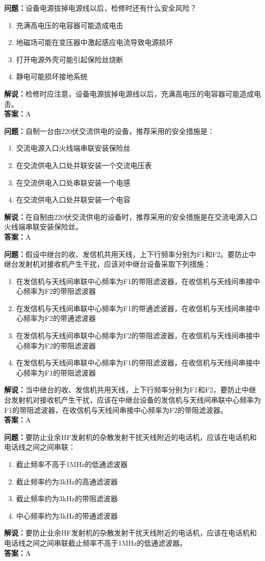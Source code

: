 \documentclass{ctexbook}%
\begin{document}
\textbf{问题：}设备电源拔掉电源线以后，检修时还有什么安全风险？
\begin{enumerate}[label=\Alph*), leftmargin=3em]
\item 充满高电压的电容器可能造成电击
\item 地磁场可能在变压器中激起感应电流导致电源损坏
\item 打开电源外壳可能引起保险丝烧断
\item 静电可能损坏接地系统
\end{enumerate}
\textbf{解说：}检修时应注意，设备电源拔掉电源线以后，充满高电压的电容器可能造成电击。\\
\textbf{答案：}A

\textbf{问题：}自制一台由220伏交流供电的设备，推荐采用的安全措施是：
\begin{enumerate}[label=\Alph*), leftmargin=3em]
\item 交流电源入口火线端串联安装保险丝
\item 在交流供电入口处并联安装一个交流电压表
\item 在交流供电入口处串联安装一个电感
\item 在交流供电入口处并联安装一个电容
\end{enumerate}
\textbf{解说：}在自制由220伏交流供电的设备时，推荐采用的安全措施是在交流电源入口火线端串联安装保险丝。\\
\textbf{答案：}A

\textbf{问题：}假设中继台的收、发信机共用天线，上下行频率分别为F1和F2。要防止中继台发射机对接收机产生干扰，应该对中继台设备采取下列措施：
\begin{enumerate}[label=\Alph*), leftmargin=3em]
\item 在发信机与天线间串联中心频率为F1的带阻滤波器，在收信机与天线间串接中心频率为F2的带阻滤波器
\item 在发信机与天线间串联中心频率为F1的带通滤波器，在收信机与天线间串接中心频率为F2的带通滤波器
\item 在发信机与天线间串联中心频率为F2的带阻滤波器，在收信机与天线间串接中心频率为F2的带阻滤波器
\item 在发信机与天线间串联中心频率为F1的带阻滤波器，在收信机与天线间串接中心频率为F1的带阻滤波器
\end{enumerate}
\textbf{解说：}当中继台的收、发信机共用天线，上下行频率分别为F1和F2，要防止中继台发射机对接收机产生干扰，应该在中继台设备的发信机与天线间串联中心频率为F1的带阻滤波器，在收信机与天线间串接中心频率为F2的带阻滤波器。\\
\textbf{答案：}A

\textbf{问题：}要防止业余HF发射机的杂散发射干扰天线附近的电话机，应该在电话机和电话线之间之间串联：
\begin{enumerate}[label=\Alph*), leftmargin=3em]
\item 截止频率不高于1MHz的低通滤波器
\item 截止频率约为3kHz的高通滤波器
\item 截止频率约为3kHz的带阻滤波器
\item 中心频率约为3kHz的带通滤波器
\end{enumerate}
\textbf{解说：}要防止业余HF发射机的杂散发射干扰天线附近的电话机，应该在电话机和电话线之间之间串联截止频率不高于1MHz的低通滤波器。\\
\textbf{答案：}A
\end{document}
